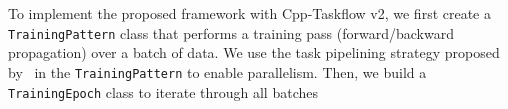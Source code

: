 \documentclass[conference]{IEEEtran}
\begin{document}

To implement the proposed framework with Cpp-Taskflow v2, we first create a \lstinline{TrainingPattern} class that performs 
a training pass (forward/backward propagation) over a batch of data. 
We use the task pipelining strategy proposed by~\cite{Huang_19_01} in the \lstinline{TrainingPattern} 
to enable parallelism.
Then, we build a \lstinline{TrainingEpoch} class to iterate through all batches
\end{document}
